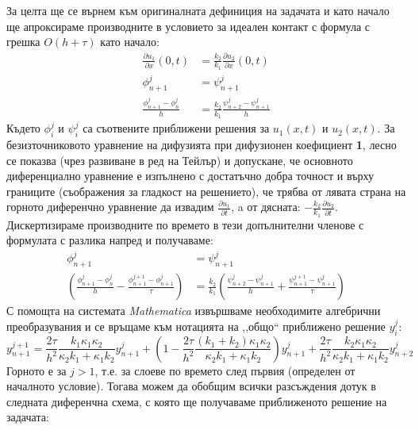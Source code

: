 За целта ще се върнем към оригиналната дефиниция на задачата и като начало ще апроксираме производните в условието за идеален контакт с формула с  грешка $O(h+\tau)$ като начало:
\begin{align*}
    \frac{\partial u_1}{\partial x} (0, t) &= \frac{k_2}{k_1} \frac{\partial u_2}{\partial x} (0, t) \\
    \phi_{n+1}^{j} &= \psi_{n+1}^{j} \\
    \frac{\phi_{n+1}^{j} - \phi_{n}^{j}}{h} &=  \frac{k_2}{k_1} \frac{\psi_{n+2}^{j} - \psi_{n+1}^{j}}{h}
\end{align*}
Където $\phi_i^j$ и $\psi_i^j$ са съотвените приближени решения за $u_1(x,t)$ и $u_2(x,t)$.
За безизточниковото уравнение на дифузията при дифузионен коефициент \textbf{1}, лесно се показва (чрез развиване в ред на Тейлър) и допускане, че основното диференциално уравнение
е изпълнено с достатъчно добра точност и върху границите (съображения за гладкост на решението), че трябва от лявата страна на горното диференчно уравнение да извадим $\frac{\partial u_1}{\partial t}$, a от дясната: $-\frac{k_2}{k_1}\frac{\partial u_2}{\partial t}$.
Дискертизираме производните по времето в тези допълнителни членове с формулата с разлика напред и получаваме:
\begin{align*}
    \phi_{n+1}^{j} &= \psi_{n+1}^{j} \\
    \left(\frac{\phi_{n+1}^{j} - \phi_{n}^{j}}{h} - \frac{\phi_{n+1}^{j+1}-\phi_{n+1}^{j}}{\tau}\right) &=  \frac{k_2}{k_1} \left(\frac{\psi_{n+2}^{j} - \psi_{n+1}^{j}}{h} + \frac{ \psi_{n+1}^{j+1}-\psi_{n+1}^{j}}{\tau}\right)
\end{align*}
С помощта на системата \textit{Mathematica} извършваме необходимите алгебрични преобразувания и се връщаме към нотацията на ,,общо`` приближено решение $y_i^j$:
\begin{equation}
    y_{n+1}^{j+1} = \frac{2 \tau}{h^2} \frac{k_1 \kappa_1 \kappa_2 }{\kappa_2 k_1 + \kappa_1 k_2} y_{n+1}^j + \left( 1 - \frac{2 \tau}{h^2}  \frac{(k_1 + k_2) \kappa_1 \kappa_2 }{\kappa_2 k_1 + \kappa_1 k_2} \right) y_{n+1}^j + \frac{2 \tau}{h^2} \frac{k_2 \kappa_1 \kappa_2 }{\kappa_2 k_1 + \kappa_1 k_2} y_{n+2}^j
\end{equation}
Горното е за $j > 1$, т.е. за слоеве по времето след първия (определен от началното условие).
Тогава можем да обобщим всички разсъждения дотук в следната диференчна схема, с която ще получаваме приближеното решение на задачата:
